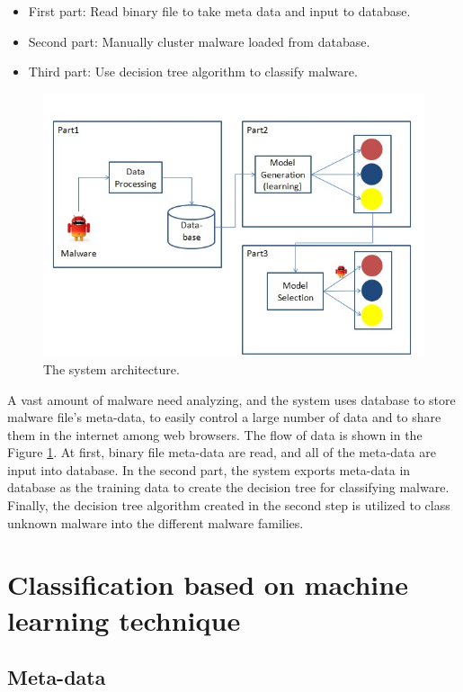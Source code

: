 \begin{itemize}
\item First part: Read binary file to take meta data and input to database.
\item Second part: Manually cluster malware loaded from database.
\item Third part: Use decision tree algorithm to classify malware.
\end{itemize}
\begin{figure}[h!]
\centering
\includegraphics[width=1\textwidth]
{graph/system_architec.jpg}
\caption{The system architecture.}
\label{fig:system_architec}
\end{figure}

A vast amount of malware need analyzing, and the system uses database to store malware file's meta-data, to easily control a large number of data and to share them in the internet among web browsers.
The flow of data is shown in the Figure \ref{fig:system_architec}. At first, binary file meta-data are read, and all of the meta-data are input into database. In the second part, the system exports meta-data in database as the training data to create the decision tree for classifying malware. Finally, the decision tree algorithm created in the second step is utilized to class  unknown malware into the different malware families. 
%
%
\section{Classification based on machine learning technique} 
\subsection{Meta-data}

